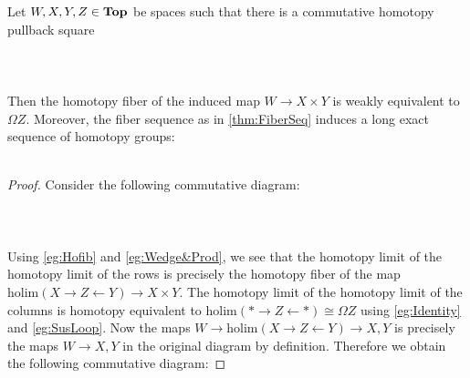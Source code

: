 \begin{prp}\label{prp:LESHpull} Let $W,X,Y,Z\in\bold{Top}$ be spaces such that there is a commutative homotopy pullback square  
 \\~\\  \\~\\
Then the homotopy fiber of the induced map $W\to X\times Y$ is weakly equivalent to $\Omega Z$. Moreover, the fiber sequence as in \ref{thm:FiberSeq} induces a long exact sequence of homotopy groups:
\\~\\  
\begin{proof}
Consider the following commutative diagram:
\\~\\  \\~\\
Using \ref{eg:Hofib} and \ref{eg:Wedge&Prod}, we see that the homotopy limit of the homotopy limit of the rows is precisely the homotopy fiber of the map $\text{holim}(X\rightarrow Z\leftarrow Y)\to X\times Y$. The homotopy limit of the homotopy limit of the columns is homotopy equivalent to $\text{holim}(\ast\rightarrow Z\leftarrow\ast)\cong\Omega Z$ using \ref{eg:Identity} and \ref{eg:SusLoop}. Now the maps $W\to\text{holim}(X\rightarrow Z\leftarrow Y)\to X,Y$ is precisely the maps $W\to X,Y$ in the original diagram by definition. Therefore we obtain the following commutative diagram: 

\end{proof}
\end{prp}
